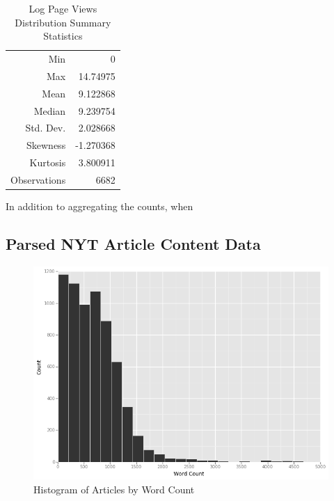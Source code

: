 \documentclass[fleqn,12pt]{SelfArx} %
\begin{document}
\begin{table}[hbt]
\caption{Log Page Views Distribution Summary Statistics}
\centering
\begin{tabular}{rr}
\toprule
Min               &  0\\
Max               &  14.74975\\  
Mean              &  9.122868\\
Median            &  9.239754\\
Std. Dev.         &  2.028668\\
Skewness          &  -1.270368\\
Kurtosis          &  3.800911\\
\midrule
Observations &  6682\\
\bottomrule
\end{tabular}
\end{table}


In addition to aggregating the counts, when 

\subsection{Parsed NYT Article Content Data}

\begin{figure}[ht]\centering
\includegraphics[width=\linewidth]{wordcount_hist}
\caption{Histogram of Articles by Word Count}
\label{fig:pv_hist}
\end{figure}
\end{document}
